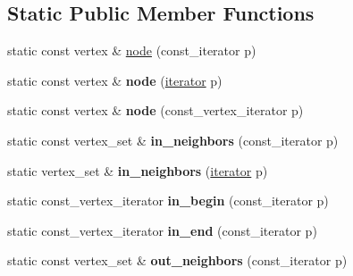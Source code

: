 \subsection*{Static Public Member Functions}
\begin{DoxyCompactItemize}
\item 
static const vertex \& \mbox{\hyperlink{class_n_graph_1_1t_graph_a826e79cbe8d540de7f044c6ae841dd5f}{node}} (const\+\_\+iterator p)
\item 
\mbox{\label{class_n_graph_1_1t_graph_a2f6c033bad7dd6e4883de81510901aec}} 
static const vertex \& {\bfseries node} (\mbox{\hyperlink{class_n_graph_1_1t_graph_a6e446a33b74e5c0c39fb6c50a4f07cec}{iterator}} p)
\item 
\mbox{\label{class_n_graph_1_1t_graph_a4bc654a0d0ddba8df6048e4eac5a1729}} 
static const vertex \& {\bfseries node} (const\+\_\+vertex\+\_\+iterator p)
\item 
\mbox{\label{class_n_graph_1_1t_graph_a820f6a863d8d838cd4403b9156bc959a}} 
static const vertex\+\_\+set \& {\bfseries in\+\_\+neighbors} (const\+\_\+iterator p)
\item 
\mbox{\label{class_n_graph_1_1t_graph_aca61e35bcd5af8b66b3c87673771508d}} 
static vertex\+\_\+set \& {\bfseries in\+\_\+neighbors} (\mbox{\hyperlink{class_n_graph_1_1t_graph_a6e446a33b74e5c0c39fb6c50a4f07cec}{iterator}} p)
\item 
\mbox{\label{class_n_graph_1_1t_graph_a3152b5d0315b94d8cb1b24a70988d990}} 
static const\+\_\+vertex\+\_\+iterator {\bfseries in\+\_\+begin} (const\+\_\+iterator p)
\item 
\mbox{\label{class_n_graph_1_1t_graph_a89d7cf140e48b1d37b6534035872ab88}} 
static const\+\_\+vertex\+\_\+iterator {\bfseries in\+\_\+end} (const\+\_\+iterator p)
\item 
\mbox{\label{class_n_graph_1_1t_graph_a1bd0815f5c00d624dbed8bddffab19ae}} 
static const vertex\+\_\+set \& {\bfseries out\+\_\+neighbors} (const\+\_\+iterator p)
\item 
\mbox{\label{class_n_graph_1_1t_graph_a43c8b50d4a2a21c5e673510e76fa303e}} 

\end{DoxyCompactItemize}
